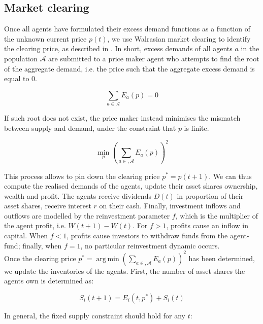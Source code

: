 \documentclass{article}
\DeclareMathOperator*{\argmin}{arg\,min}
\begin{document}
\subsection{Market clearing}

Once all agents have formulated their excess demand functions as a function of the unknown current price $p(t)$, we use Walrasian market clearing to identify the clearing price, as described in \cite{scholl2020market}. In short, excess demands of all agents $a$ in the population $ \mathcal{A}$ are submitted to a price maker agent who attempts to find the root of the aggregate demand, i.e. the price such that the aggregate excess demand is equal to 0.

\begin{equation}
\label{market_clearing_root}
\sum_{a \in \mathcal{A}} E_{a}(p)=0
\end{equation}

If such root does not exist, the price maker instead minimises the mismatch between supply and demand, under the constraint that $p$ is finite.

\begin{equation}
\label{market_clearing_mismatch}
\min_p\left(\sum_{a \in, \mathcal{A}} E_{a}(p)\right)^{2}
\end{equation}

This process allows to pin down the clearing price $p^* = p(t+1)$. We can thus compute the realised demands of the agents, update their asset shares ownership, wealth and profit. The agents receive dividends $D(t)$ in proportion of their asset shares, receive interest $r$ on their cash. Finally, investment inflows and outflows are modelled by the reinvestment parameter $f$, which is the multiplier of the agent profit, i.e. $W(t+1) - W(t)$. For $f > 1$, profits cause an inflow in capital. When $f < 1$, profits cause investors to withdraw funds from the agent-fund; finally, when $f=1$, no particular reinvestment dynamic occurs. \\

Once the clearing price $p^* = \argmin \left(\sum_{a \in, \mathcal{A}} E_{a}(p)\right)^{2} $ has been determined, we update the inventories of the agents.
First, the number of asset shares the agents own is determined as:

\begin{equation}
    S_i(t+1) = E_i(t, p^*) + S_i(t)
\end{equation}

In general, the fixed supply constraint should hold for any $t$:
\end{document}
